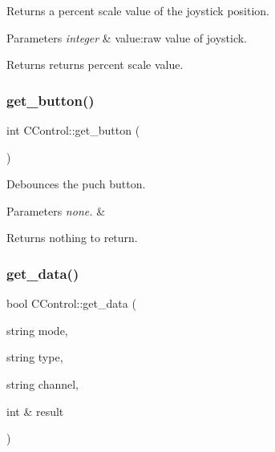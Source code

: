 Returns a percent scale value of the joystick position. 


\begin{DoxyParams}{Parameters}
{\em integer} & value\+:raw value of joystick.\\
\hline
\end{DoxyParams}
\begin{DoxyReturn}{Returns}
returns percent scale value. 
\end{DoxyReturn}
\hypertarget{class_c_control_afae6ad2b10c7afb9c627e7824f30ff42}{}\label{class_c_control_afae6ad2b10c7afb9c627e7824f30ff42} 
\subsubsection{\texorpdfstring{get\+\_\+button()}{get\_button()}}
{\footnotesize\ttfamily int C\+Control\+::get\+\_\+button (\begin{DoxyParamCaption}{ }\end{DoxyParamCaption})}



Debounces the puch button. 


\begin{DoxyParams}{Parameters}
{\em none.} & \\
\hline
\end{DoxyParams}
\begin{DoxyReturn}{Returns}
nothing to return. 
\end{DoxyReturn}
\hypertarget{class_c_control_a08d481253181db60a8aec73583a1713f}{}\label{class_c_control_a08d481253181db60a8aec73583a1713f} 
\subsubsection{\texorpdfstring{get\+\_\+data()}{get\_data()}}
{\footnotesize\ttfamily bool C\+Control\+::get\+\_\+data (\begin{DoxyParamCaption}\item[{string}]{mode,  }\item[{string}]{type,  }\item[{string}]{channel,  }\item[{int \&}]{result }\end{DoxyParamCaption})}



